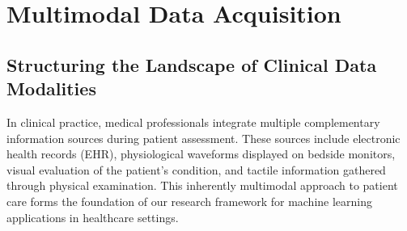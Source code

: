 \chapter{Multimodal Data Acquisition}
\label{ch:multi-modal-data-acquisition}

\section{Structuring the Landscape of Clinical Data Modalities}
\label{sec:structuring-the-landscape-of-clinical-data-modalities}

In clinical practice, medical professionals integrate multiple complementary information sources during patient assessment. These sources include electronic health records (EHR), physiological waveforms displayed on bedside monitors, visual evaluation of the patient's condition, and tactile information gathered through physical examination. This inherently multimodal approach to patient care forms the foundation of our research framework for machine learning applications in healthcare settings.

